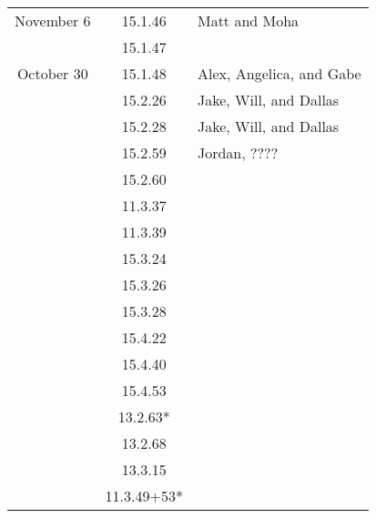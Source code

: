 \documentclass[12pt]{amsart}
\begin{document}
\begin{longtable}{c|c|l}
        November 6      & 15.1.46                              & Matt and Moha                            \\
                        & 15.1.47                              &                                          \\
        October 30      & 15.1.48                              & Alex, Angelica, and Gabe                 \\
                        & 15.2.26                              & Jake, Will, and Dallas                   \\
                        & 15.2.28                              & Jake, Will, and Dallas                   \\
                        & 15.2.59                              & Jordan, ????                             \\
                        & 15.2.60                              &                                          \\
                        & 11.3.37                              &                                          \\
                        & 11.3.39                              &                                          \\
                        & 15.3.24                              &                                          \\
                        & 15.3.26                              &                                          \\
                        & 15.3.28                              &                                          \\
                        & 15.4.22                              &                                          \\
                        & 15.4.40                              &                                          \\
                        & 15.4.53                              &                                          \\
                        & 13.2.63*                             &                                          \\
                        & 13.2.68                              &                                          \\
                        & 13.3.15                              &                                          \\
                        & 11.3.49+53*                          &                                          
    \end{longtable}
\end{document}
